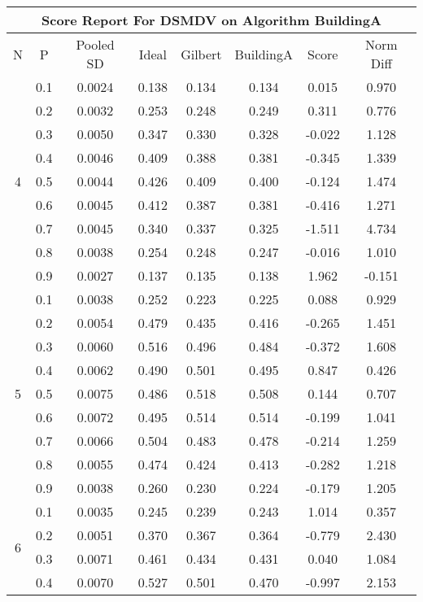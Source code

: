 \documentclass[11pt,a4paper]{report}
\begin{document}
\begin{longtable}{ | c | c || c | c | c | c | c | c | }
\hline
\multicolumn{8}{|c|}{ Score Report For DSMDV on Algorithm BuildingA} \\
\hline
N & P & Pooled SD &  Ideal &  Gilbert & BuildingA  & Score & Norm Diff \\
 \hline
 \hline
 \endhead
\multirow{9}{*}{4} & 0.1 & 0.0024 & 0.138 & 0.134 & 0.134 & 0.015 & 0.970 \\
 & 0.2 & 0.0032 & 0.253 & 0.248 & 0.249 & 0.311 & 0.776 \\
 & 0.3 & 0.0050 & 0.347 & 0.330 & 0.328 & -0.022 & 1.128 \\
 & 0.4 & 0.0046 & 0.409 & 0.388 & 0.381 & -0.345 & 1.339 \\
 & 0.5 & 0.0044 & 0.426 & 0.409 & 0.400 & -0.124 & 1.474 \\
 & 0.6 & 0.0045 & 0.412 & 0.387 & 0.381 & -0.416 & 1.271 \\
 & 0.7 & 0.0045 & 0.340 & 0.337 & 0.325 & -1.511 & 4.734 \\
 & 0.8 & 0.0038 & 0.254 & 0.248 & 0.247 & -0.016 & 1.010 \\
 & 0.9 & 0.0027 & 0.137 & 0.135 & 0.138 & 1.962 & -0.151 \\
 \hline
\multirow{9}{*}{5} & 0.1 & 0.0038 & 0.252 & 0.223 & 0.225 & 0.088 & 0.929 \\
 & 0.2 & 0.0054 & 0.479 & 0.435 & 0.416 & -0.265 & 1.451 \\
 & 0.3 & 0.0060 & 0.516 & 0.496 & 0.484 & -0.372 & 1.608 \\
 & 0.4 & 0.0062 & 0.490 & 0.501 & 0.495 & 0.847 & 0.426 \\
 & 0.5 & 0.0075 & 0.486 & 0.518 & 0.508 & 0.144 & 0.707 \\
 & 0.6 & 0.0072 & 0.495 & 0.514 & 0.514 & -0.199 & 1.041 \\
 & 0.7 & 0.0066 & 0.504 & 0.483 & 0.478 & -0.214 & 1.259 \\
 & 0.8 & 0.0055 & 0.474 & 0.424 & 0.413 & -0.282 & 1.218 \\
 & 0.9 & 0.0038 & 0.260 & 0.230 & 0.224 & -0.179 & 1.205 \\
 \hline
\multirow{9}{*}{6} & 0.1 & 0.0035 & 0.245 & 0.239 & 0.243 & 1.014 & 0.357 \\
 & 0.2 & 0.0051 & 0.370 & 0.367 & 0.364 & -0.779 & 2.430 \\
 & 0.3 & 0.0071 & 0.461 & 0.434 & 0.431 & 0.040 & 1.084 \\
 & 0.4 & 0.0070 & 0.527 & 0.501 & 0.470 & -0.997 & 2.153 \\

\end{longtable}
\end{document}
